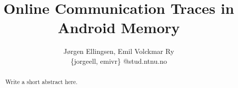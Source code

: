 \documentclass{sig-alternate-05-2015}
\begin{document}
\title{Online Communication Traces in Android Memory}

\author{
J{\o}rgen Ellingsen, Emil Volckmar Ry \\
\{jorgeell, emivr\} @stud.ntnu.no
}

\maketitle
\begin{abstract}
Write a short abstract here.
\end{abstract}
















  
\end{document}
